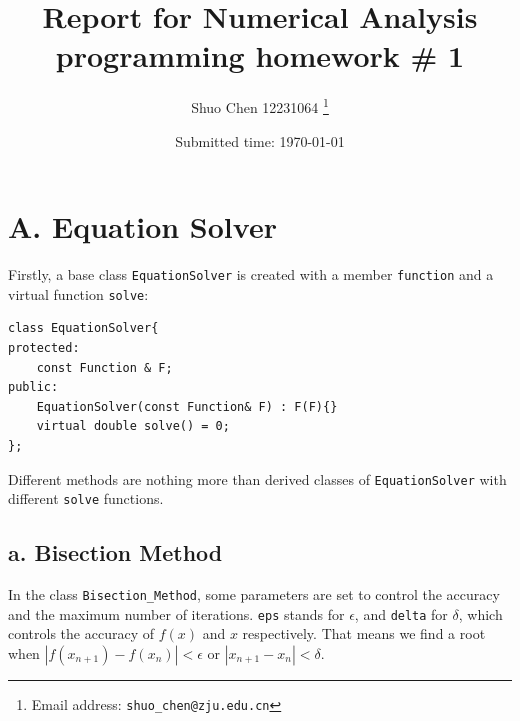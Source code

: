 \documentclass[a4paper]{article}
\begin{document}
\title{Report for Numerical Analysis programming homework \# 1}

\author{Shuo Chen 12231064
  \thanks{Email address: \texttt{shuo\_chen@zju.edu.cn}}}



\date{Submitted time: \today}

\maketitle

\section*{A. Equation Solver}

Firstly, a base class \verb|EquationSolver| is created with a member \verb|function| and a virtual function \verb|solve|:
\begin{lstlisting}
class EquationSolver{
protected:
    const Function & F;
public:
    EquationSolver(const Function& F) : F(F){}
    virtual double solve() = 0;
};
\end{lstlisting}
Different methods are nothing more than derived classes of \verb|EquationSolver| with different \verb|solve| functions.
\subsection*{a. Bisection Method}
In the class \verb|Bisection_Method|, some parameters are set to control the accuracy and the maximum number of iterations. \verb|eps| stands for $\epsilon$, 
and \verb|delta| for $\delta$, which controls the accuracy of $f(x)$ and $x$ respectively. That means we find a root when $|f(x_{n+1})-f(x_n)| < \epsilon$ or $|x_{n+1}-x_n| < \delta$.
\end{document}
